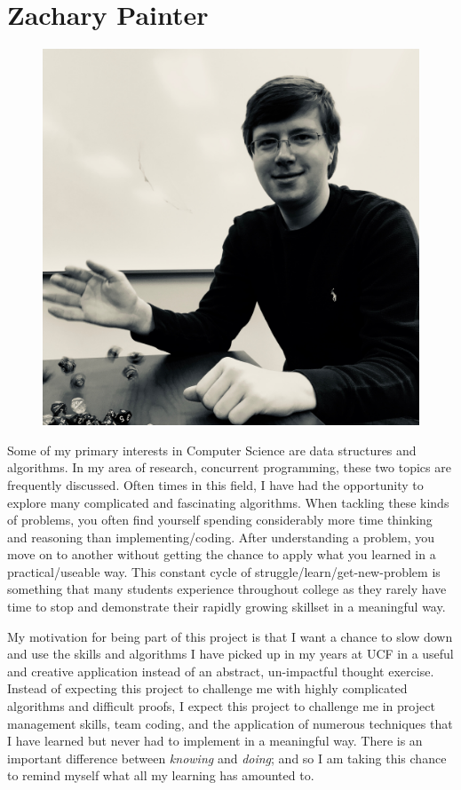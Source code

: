 \documentclass[12pt,a4paper]{report}
\begin{document}
	\newpage
	\section{Zachary Painter}
	\begin{figure}
		\includegraphics[scale=0.05]{Zachary_Painter}
	\end{figure}
	Some of my primary interests in Computer Science are data structures and algorithms. In my area of research, concurrent programming, these two topics are frequently discussed. Often times in this field, I have had the opportunity to explore many complicated and fascinating algorithms. When tackling these kinds of problems, you often find yourself spending considerably more time thinking and reasoning than implementing/coding. After understanding a problem, you move on to another without getting the chance to apply what you learned in a practical/useable way. This constant cycle of struggle/learn/get-new-problem is something that many students experience throughout college as they rarely have time to stop and demonstrate their rapidly growing skillset in a meaningful way. \par
	My motivation for being part of this project is that I want a chance to slow down and use the skills and algorithms I have picked up in my years at UCF in a useful and creative application instead of an abstract, un-impactful thought exercise. Instead of expecting this project to challenge me with highly complicated algorithms and difficult proofs, I expect this project to challenge me in project management skills, team coding, and the application of numerous techniques that I have learned but never had to implement in a meaningful way. There is an important difference between \textit{knowing} and \textit{doing}; and so I am taking this chance to remind myself what all my learning has amounted to. 
	
\end{document}
